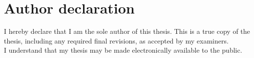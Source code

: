 
\begingroup
\let\clearpage\relax
\let\cleardoublepage\relax
\let\cleardoublepage\relax
\chapter*{Author declaration}
I hereby declare that I am the sole author of this thesis. This is a true copy of the thesis, including any required final revisions, as accepted by my examiners. \\

\noindent
I understand that my thesis may be made electronically available to the public.

\endgroup